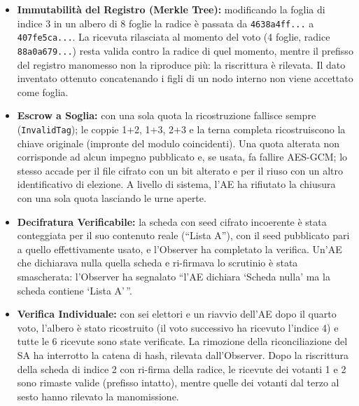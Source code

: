 \documentclass[12pt,a4paper]{article}
\begin{document}
\begin{itemize}
  \item \textbf{Immutabilità del Registro (Merkle Tree):} modificando la foglia di indice 3 in un albero di 8 foglie la radice è passata da \texttt{4638a4ff...} a \texttt{407fe5ca...}. La ricevuta rilasciata al momento del voto (4 foglie, radice \texttt{88a0a679...}) resta valida contro la radice di quel momento, mentre il prefisso del registro manomesso non la riproduce più: la riscrittura è rilevata. Il dato inventato ottenuto concatenando i figli di un nodo interno non viene accettato come foglia.
  \item \textbf{Escrow a Soglia:} con una sola quota la ricostruzione fallisce sempre (\texttt{InvalidTag}); le coppie 1+2, 1+3, 2+3 e la terna completa ricostruiscono la chiave originale (impronte del modulo coincidenti). Una quota alterata non corrisponde ad alcun impegno pubblicato e, se usata, fa fallire AES-GCM; lo stesso accade per il file cifrato con un bit alterato e per il riuso con un altro identificativo di elezione. A livello di sistema, l'AE ha rifiutato la chiusura con una sola quota lasciando le urne aperte.
  \item \textbf{Decifratura Verificabile:} la scheda con seed cifrato incoerente è stata conteggiata per il suo contenuto reale (``Lista A''), con il seed pubblicato pari a quello effettivamente usato, e l'Observer ha completato la verifica. Un'AE che dichiarava nulla quella scheda e ri-firmava lo scrutinio è stata smascherata: l'Observer ha segnalato ``l'AE dichiara `Scheda nulla' ma la scheda contiene `Lista A'\,''.
  \item \textbf{Verifica Individuale:} con sei elettori e un riavvio dell'AE dopo il quarto voto, l'albero è stato ricostruito (il voto successivo ha ricevuto l'indice 4) e tutte le 6 ricevute sono state verificate. La rimozione della riconciliazione del SA ha interrotto la catena di hash, rilevata dall'Observer. Dopo la riscrittura della scheda di indice 2 con ri-firma della radice, le ricevute dei votanti 1 e 2 sono rimaste valide (prefisso intatto), mentre quelle dei votanti dal terzo al sesto hanno rilevato la manomissione.
\end{itemize}
\end{document}
